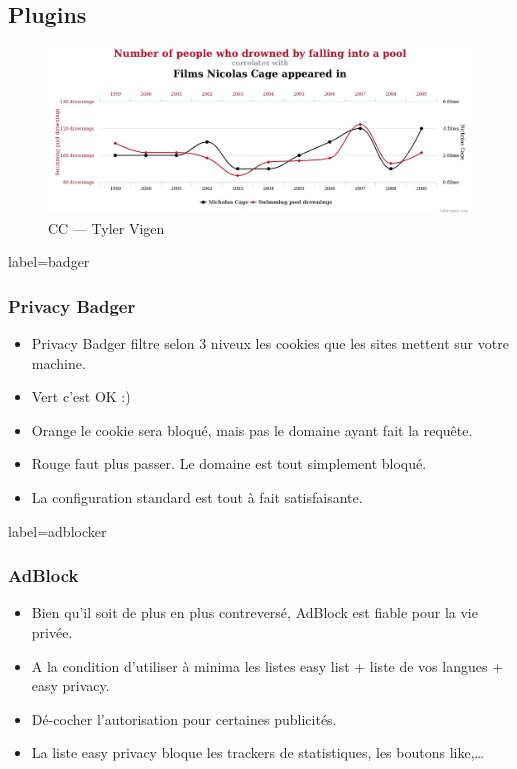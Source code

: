 \documentclass{beamer}
\begin{document}
    \subsection{Plugins}
        \begin{frame}
            \begin{center}
                \begin{figure}
                    \includegraphics[scale=0.15]{img/data_science.jpg}
                    \caption{CC --- Tyler Vigen}
                \end{figure}
            \end{center}
        \end{frame}
        \begin{frame}{label=badger}
            \frametitle{Privacy Badger}
            \begin{center}
                \begin{itemize}
                    \item Privacy Badger filtre selon 3 niveux les cookies que les sites mettent sur votre machine.
                    \item Vert c'est OK :)
                    \item Orange le cookie sera bloqué, mais pas le domaine ayant fait la requête.
                    \item Rouge faut plus passer. Le domaine est tout simplement bloqué.
                    \item La configuration standard est tout à fait satisfaisante.
                \end{itemize}
            \end{center}
        \end{frame}
        \begin{frame}{label=adblocker}
            \frametitle{AdBlock}
            \begin{center}
                \begin{itemize}
                    \item Bien qu'il soit de plus en plus contreversé, AdBlock est fiable pour la vie privée.
                    \item A la condition d'utiliser à minima les listes easy list + liste de vos langues + easy privacy.
                    \item Dé-cocher l'autorisation pour certaines publicités.
                    \item La liste easy privacy bloque les trackers de statistiques, les boutons like,\ldots
                \end{itemize}
            \end{center}
        \end{frame}
\end{document}
